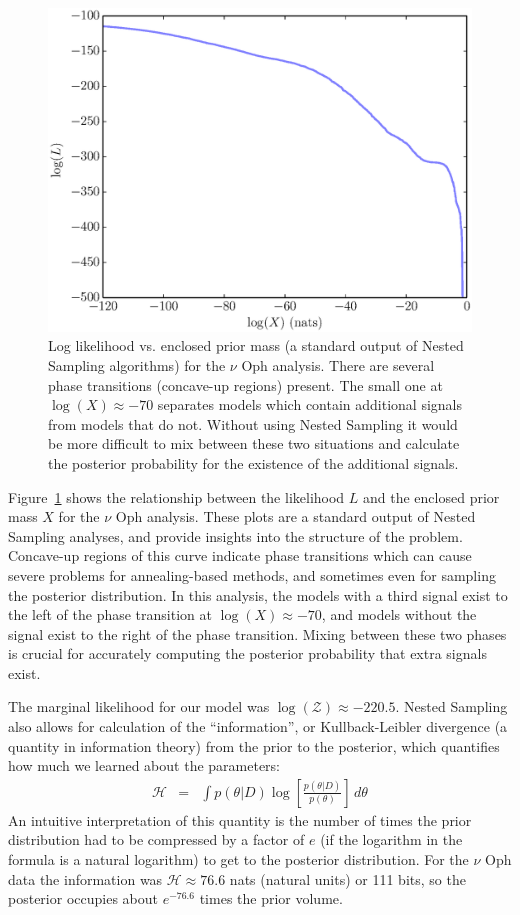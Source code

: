 \documentclass[useAMS,usenatbib]{mn2e}
\begin{document}
\begin{figure}
\includegraphics[scale=0.45]{Figures/logl0.eps}
\caption{Log likelihood vs. enclosed prior mass (a standard output of Nested
Sampling algorithms) for the $\nu$ Oph analysis.
There are several phase transitions (concave-up regions) present. The small one at
$\log(X) \approx -70$ separates models which contain additional signals from
models that do not. Without using Nested Sampling it would be more difficult
to mix between these two situations and calculate the posterior probability
for the existence of the additional signals.
\label{fig:logl0}}
\end{figure}

Figure~\ref{fig:logl0} shows the relationship between the likelihood $L$
and the enclosed prior mass $X$ for the $\nu$ Oph analysis. These plots are
a standard output of Nested Sampling analyses, and provide
insights into the structure of the problem. Concave-up regions of this curve
indicate phase transitions which can cause severe problems for annealing-based
methods, and sometimes even for sampling the posterior distribution. In this
analysis, the models with a third signal exist to the left of the phase
transition at $\log(X) \approx -70$, and models without the signal exist to the
right of the phase transition. Mixing between these two phases is crucial for
accurately computing the posterior probability that extra signals exist.

The marginal likelihood for our model was
$\log(\mathcal{Z}) \approx -220.5$. Nested Sampling also allows for calculation
of the ``information'', or Kullback-Leibler divergence (a quantity in information
theory) from the prior to the posterior, which quantifies how much we learned about the parameters:
\begin{eqnarray}
\mathcal{H} &=& \int p(\theta | D) \log\left[\frac{p(\theta | D)}{p(\theta)}\right] \, d\theta
\end{eqnarray}
An intuitive interpretation of this quantity is the number of times the
prior distribution had to be compressed by a factor of $e$ (if the logarithm
in the formula is a natural logarithm) to get to the posterior distribution.
For the $\nu$ Oph data the information was $\mathcal{H} \approx 76.6$ nats
(natural units) or 111 bits, so the posterior occupies about $e^{-76.6}$ times
the prior volume.
\end{document}
